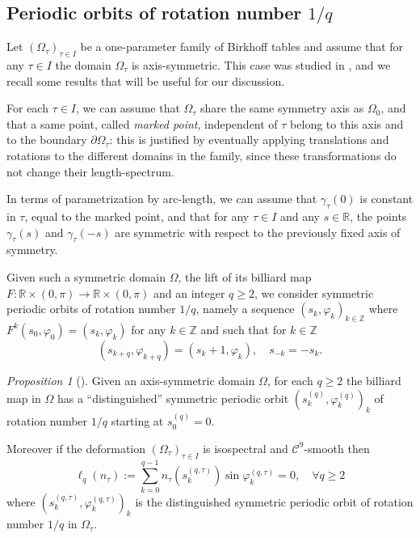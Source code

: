 \documentclass[12pt, openany]{amsart}
\theoremstyle{definition}
\theoremstyle{remark}
\theoremstyle{remark}
\theoremstyle{theorem}
\theoremstyle{theorem}
\theoremstyle{theorem}
\newtheorem{proposition}[theorem]{Proposition}
\theoremstyle{theorem}
\newcommand{\ZZ}{\mathbb{Z}}
\newcommand{\RR}{\mathbb{R}}
\begin{document}
\medskip

\subsection{Periodic orbits of rotation number $1/q$}
\label{subsection:DKW_proof}
Let $(\Omega_{\tau})_{\tau\in I}$ be a one-parameter family of Birkhoff tables and assume that for any $\tau\in I$ the domain $\Omega_{\tau}$ is axis-symmetric. This case was studied in \cite{DKW}, and we recall some results that will be useful for our discussion.

For each $\tau\in I$, we can assume that $\Omega_{\tau}$ share the same symmetry axis as $\Omega_0$, and that a same point, called \textit{marked point}, independent of $\tau$ belong to this axis and to the boundary $\partial\Omega_{\tau}$: this is justified by eventually applying translations and rotations to the different domains in the family, since these transformations do not change their length-spectrum.

In terms of parametrization by arc-length, we can assume that $\gamma_{\tau}(0)$ is constant in $\tau$, equal to the marked point, and that for any $\tau\in I$ and any $s\in\RR$, the points $\gamma_{\tau}(s)$ and $\gamma_{\tau}(-s)$ are symmetric with respect to the previously fixed axis of symmetry.

Given such a symmetric domain $\Omega$, the lift of its billiard map $F:\RR\times(0,\pi)\to \RR\times(0,\pi)$ and an integer $q\geq 2$, we consider symmetric periodic orbits of rotation number $1/q$, namely a sequence $(s_k,\varphi_k)_{k\in\ZZ}$ where $F^k(s_0,\varphi_0)=(s_k,\varphi_k)$ for any $k\in\ZZ$ and such that for $k\in\ZZ$
\[
(s_{k+q},\varphi_{k+q}) = (s_k+1,\varphi_k),\quad
s_{-k} = -s_k.
\]

\medskip
\begin{proposition}[\cite{DKW}]
\label{proposition:isospectral_DKW}
Given an axis-symmetric domain $\Omega$, for each $q\geq 2$ the billiard map in $\Omega$ has a ``distinguished'' symmetric periodic orbit $(s_k^{(q)},\varphi_k^{(q)})_k$ of rotation number $1/q$ starting at $s_0^{(q)}=0$.  

Moreover if the deformation $(\Omega_{\tau})_{\tau\in I}$ is isospectral and $\mathscr C^9$-smooth then
\begin{equation} 
\ell_q(n_{\tau}) := \sum_{k=0}^{q-1}n_{\tau}(s_k^{(q,\tau)})\sin\varphi_k^{(q,\tau)} = 0,\quad\forall q\geq 2
\end{equation}
where $(s_k^{(q,\tau)},\varphi_k^{(q,\tau)})_k$ is the distinguished symmetric periodic orbit  of rotation number $1/q$ in $\Omega_{\tau}$.
\end{proposition}
\end{document}
